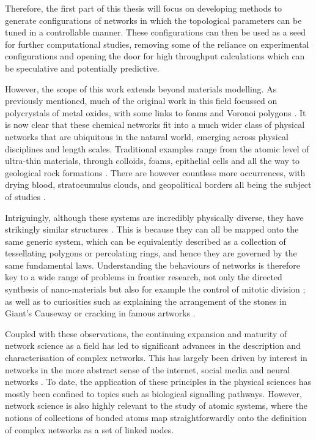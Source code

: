 Therefore, the first part of this thesis will focus on developing methods to generate configurations of \td{} networks in which the topological parameters can be tuned in a controllable manner.
These configurations can then be used as a seed for further computational studies, removing some of the reliance on experimental configurations and opening the door for high throughput calculations which can be speculative and potentially predictive.

However, the scope of this work extends beyond materials modelling.
As previously mentioned, much of the original work in this field focussed on polycrystals of metal oxides, with some links to foams and Voronoi polygons \cite{Aboav1980,Boots1984}.
It is now clear that these chemical networks fit into a much wider class of \td{} physical networks that are ubiquitous in the natural world, emerging across physical disciplines and length scales.
Traditional examples range from the atomic level of ultra\--thin materials, through colloids, foams, epithelial cells and all the way to geological rock formations \cite{Earnshaw1994,Allain1995,Moncho-Jorda2000,Durand2011,Tong2017,Goehring2014}.
There are however countless more occurrences, with drying blood, stratocumulus clouds, and geopolitical borders all being the subject of studies \cite{Brutin2011,Glassmeier2017,LeCaer1993}.

Intriguingly, although these systems are incredibly physically diverse, they have strikingly similar structures \cite{Schliecker1999}. 
This is because they can all be mapped onto the same generic system, which can be equivalently described as a collection of tessellating polygons or percolating rings, and hence they are governed by the same fundamental laws. 
Understanding the behaviours of \td{} networks is therefore key to a wide range of problems in frontier research, not only the directed synthesis of nano\--materials but also for example the control of mitotic division \cite{Gibson2011,Ladan2019}; as well as to curiosities such as explaining the arrangement of the stones in Giant's Causeway or cracking in famous artworks \cite{Weaire1984,Flores2017}.

Coupled with these observations, the continuing expansion and maturity of network science as a field has led to significant advances in the description and characterisation of complex networks.
This has largely been driven by interest in networks in the more abstract sense of the internet, social media and neural networks \cite{Strogatz2001,Boccaletti2006,Barabasi2012}.
To date, the application of these principles in the physical sciences has mostly been confined to topics such as biological signalling pathways.
However, network science is also highly relevant to the study of atomic systems, where the notions of collections of bonded atoms map straightforwardly onto the definition of complex networks as a set of linked nodes.

